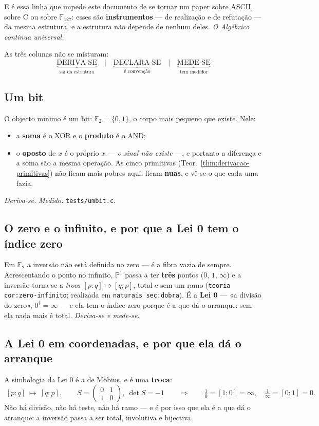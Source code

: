 \documentclass[11pt,a4paper]{article}
\newcommand{\code}[1]{\texttt{\small #1}}
\newcommand{\leitura}[1]{\code{#1}}
\begin{document}
\noindent E é essa linha que impede este documento de se tornar um paper
sobre ASCII, sobre C ou sobre $\mathbb{F}_{127}$: esses são
\textbf{instrumentos} --- de realização e de refutação --- da mesma
estrutura, e a estrutura não depende de nenhum deles. \emph{O Algébrico
continua universal.}

\medskip
\noindent As três colunas não se misturam:
\[
\boxed{\;
\underbrace{\text{DERIVA-SE}}_{\text{sai da estrutura}}
\quad\Big|\quad
\underbrace{\text{DECLARA-SE}}_{\text{é convenção}}
\quad\Big|\quad
\underbrace{\text{MEDE-SE}}_{\text{tem medidor}}
\;}
\]

\subsection*{Um bit}
O objecto mínimo é um bit: $\mathbb{F}_2=\{0,1\}$, o corpo mais pequeno
que existe. Nele:
\begin{itemize}
\item a \textbf{soma} é o XOR e o \textbf{produto} é o AND;
\item o \textbf{oposto} de $x$ é o próprio $x$ --- \emph{o sinal não
existe} ---, e portanto a diferença e a soma são a mesma operação. As
cinco primitivas (Teor.~\ref{thm:derivacao-primitivas}) não ficam mais
pobres aqui: ficam \textbf{nuas}, e vê-se o que cada uma fazia.
\end{itemize}
\emph{Deriva-se.} \emph{Medido:} \code{tests/umbit.c}.

\subsection*{O zero e o infinito, e por que a Lei 0 tem o índice zero}
Em $\mathbb{F}_2$ a inversão não está definida no zero --- é a fibra
vazia de sempre. Acrescentando o ponto no infinito, $\mathbb{P}^1$ passa
a ter \textbf{três} pontos ($0$, $1$, $\infty$) e a inversão torna-se a
\emph{troca} $[p:q]\mapsto[q:p]$, total e sem um ramo
(\leitura{teoria cor:zero-infinito}; realizada em \code{naturais sec:dobra}). É a \textbf{Lei 0} --- «a divisão do
zero», $0^{\dagger}=\infty$ --- e ela tem o índice zero porque é a que
dá o arranque: sem ela nada mais é total. \emph{Deriva-se e mede-se.}

\subsection*{A Lei 0 em coordenadas, e por que ela dá o arranque}
A simbologia da Lei 0 é a de Möbius, e é uma \textbf{troca}:
\[
\boxed{\;[p:q]\ \longmapsto\ [q:p],
\qquad S=\begin{pmatrix}0&1\\1&0\end{pmatrix},\ \det S=-1
\qquad\Longrightarrow\qquad
\tfrac10=[1:0]=\infty,\quad \tfrac1\infty=[0:1]=0 .\;}
\]
Não há divisão, não há teste, não há ramo --- e é por isso que ela é a que dá o
arranque: a inversão passa a ser total, involutiva e bijectiva.
\end{document}
